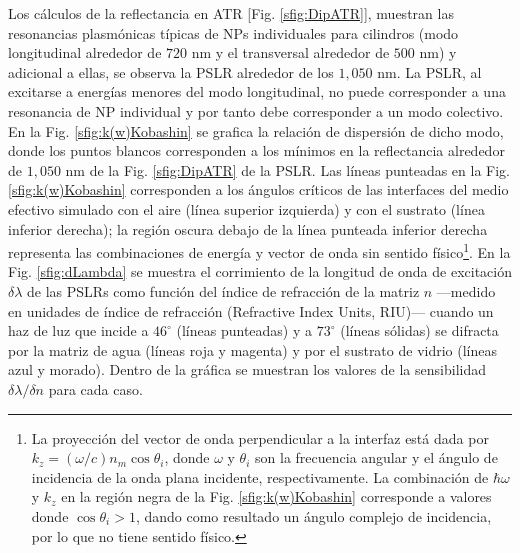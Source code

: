 Los cálculos de la reflectancia en ATR [Fig. \ref{sfig:DipATR}], muestran las resonancias plasmónicas típicas de NPs individuales para cilindros (modo longitudinal alrededor de $720$ nm y el transversal alrededor de $500$ nm) y adicional a ellas, se observa la PSLR alrededor de los $1,050$ nm. La PSLR, al excitarse a energías menores del modo longitudinal, no puede corresponder a una resonancia de NP individual y por tanto debe corresponder a un modo colectivo. En la Fig.  \ref{sfig:k(w)Kobashin} se grafica la relación de dispersión de dicho modo, donde los puntos blancos corresponden a los mínimos en la reflectancia alrededor de $1,050$ nm de la Fig.  \ref{sfig:DipATR} de la PSLR.  Las líneas punteadas en la Fig.   \ref{sfig:k(w)Kobashin} corresponden a los ángulos críticos de las interfaces del medio efectivo simulado con el aire (línea superior izquierda) y con el sustrato (línea inferior derecha); la región oscura debajo de la línea punteada inferior derecha representa las combinaciones de energía y vector de onda sin sentido físico\footnote{La proyección del vector de onda perpendicular a la interfaz está dada por $k_z = (\omega / c)n_m\cos\theta_i$, donde $\omega$ y $\theta_i$ son la frecuencia angular y el ángulo de incidencia de la onda plana incidente, respectivamente. La combinación de $\hbar\omega$ y $k_z$ en la región negra de la Fig. \ref{sfig:k(w)Kobashin} corresponde a valores donde $\cos\theta_i>1$, dando como resultado un ángulo complejo de incidencia, por lo que no tiene sentido físico.}.  En la Fig.  \ref{sfig:dLambda} se muestra el corrimiento de la longitud de onda de excitación $\delta\lambda$ de las PSLRs como función del índice de refracción de la matriz $n$ ---medido en unidades de índice de refracción (Refractive Index Units, RIU)--- cuando un haz de luz que incide a $46^\circ$ (líneas punteadas) y  a $73^\circ$ (líneas sólidas) se difracta por la matriz de agua (líneas roja y magenta) y por el sustrato de vidrio (líneas azul y morado). Dentro de la gráfica se muestran los valores de la sensibilidad $\delta \lambda/\delta n$ para cada caso.  


